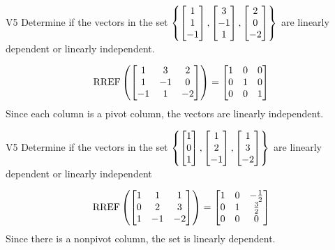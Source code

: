 \begin{problem}{V5}
Determine if the vectors in the set
\(\left\{
  \begin{bmatrix} 1 \\ 1 \\ -1 \end{bmatrix},
  \begin{bmatrix} 3 \\ -1 \\ 1 \end{bmatrix},
  \begin{bmatrix} 2 \\ 0 \\ -2 \end{bmatrix}
\right\}\)
are linearly dependent or linearly independent.
\end{problem}
\begin{solution}
\[
  \operatorname{RREF}\left(
    \begin{bmatrix} 1 & 3 & 2 \\ 1 & -1 & 0 \\ -1 & 1 & -2 \end{bmatrix}
  \right)
    =
  \begin{bmatrix} 1 & 0 &0 \\ 0 & 1 & 0 \\ 0 & 0 & 1\end{bmatrix}
\]
Since each column is a pivot column, the vectors are linearly independent.
\end{solution}


\begin{problem}{V5}
Determine if the vectors in the set
\(
  \left\{
    \begin{bmatrix} 1 \\ 0 \\ 1 \end{bmatrix},
    \begin{bmatrix} 1 \\ 2 \\ -1 \end{bmatrix},
    \begin{bmatrix} 1 \\ 3 \\ -2 \end{bmatrix}
  \right\}
\)
are linearly dependent or linearly independent
\end{problem}
\begin{solution}
\[
  \operatorname{RREF}\left(
    \begin{bmatrix} 1 &  1 & 1 \\ 0  & 2 & 3 \\ 1  & -1 & -2 \end{bmatrix}
  \right)
    =
  \begin{bmatrix} 1 &  0 & -\frac{1}{2} \\ 0  & 1 & \frac{3}{2} \\ 0& 0 & 0  \end{bmatrix}
\]
Since there is a nonpivot column, the set is linearly dependent.
\end{solution}


